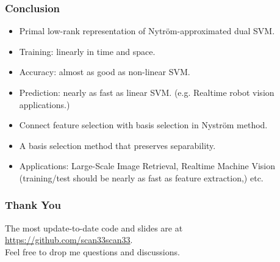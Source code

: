 \documentclass{beamer}
\begin{document}
\begin{frame}
\frametitle{Conclusion}
\begin{itemize}
  \item Primal low-rank representation of Nytr\"om-approximated dual SVM.
  \item [] Training: linearly in time and space.
  \item [] Accuracy: almost as good as non-linear SVM.
  \item [] Prediction: nearly as fast as linear SVM. (e.g. Realtime robot vision applications.)
  \item Connect feature selection with basis selection in Nystr\"om method. 
  \item [] A basis selection method that preserves separability.
  \item Applications: Large-Scale Image Retrieval, Realtime Machine Vision (training/test should be nearly as fast as feature extraction,) etc.
\end{itemize}
\end{frame}

\begin{frame}
\frametitle{Thank You}
The most update-to-date code and slides are at\\
	    \url{https://github.com/scan33scan33}.\\ 
	    Feel free to drop me questions and discussions.
\end{frame}
\end{document}
